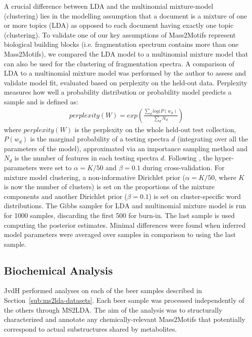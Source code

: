 A crucial difference between LDA and the multinomial mixture-model (clustering) lies in the modelling assumption that a document is a mixture of one or more topics (LDA) as opposed to each document having exactly one topic (clustering). To validate one of our key assumptions of Mass2Motifs represent biological building blocks (i.e. fragmentation spectrum contains more than one Mass2Motifs), we compared the LDA model to a multinomial mixture model that can also be used for the clustering of fragmentation spectra. A comparison of LDA to a multinomial mixture model was performed by the author to assess and validate model fit, evaluated based on perplexity on the held-out data. Perplexity measures how well a probability distribution or probability model predicts a sample and is defined as:
\begin{align*}
perplexity(W)=exp\left(\frac{\sum_{d}log(P(w_{d})}{\sum_{d}N_d}\right)
\end{align*}
where $perplexity(W)$ is the perplexity on the whole held-out test collection, $P(w_d)$ is the marginal probability of a testing spectra $d$ (integrating over all the parameters of the model), approximated via an importance sampling method \cite{wallach2009evaluation} and $N_d$ is the number of features in each testing spectra $d$. Following \cite{Griffiths2004}, the hyper-parameters were set to $\alpha=K/50$ and $\beta=0.1$ during cross-validation. For mixture model clustering, a non-informative Dirichlet prior ($\alpha=K/50$, where $K$ is now the number of clusters) is set on the proportions of the mixture components and another Dirichlet prior ($\beta=0.1$) is set on cluster-specific word distributions. The Gibbs sampler for LDA and multinomial mixture model is run for 1000 samples, discarding the first 500 for burn-in. The last sample is used computing the posterior estimates. Minimal differences were found when inferred model parameters were averaged over samples in comparison to using the last sample.

\subsection{Biochemical Analysis}

JvdH performed analyses on each of the beer samples described in Section~\ref{sub:ms2lda-datasets}. Each beer sample was processed independently of the others through MS2LDA. The aim of the analysis was to structurally characterized and annotate any chemically-relevant Mass2Motifs that potentially correspond to actual substructures shared by metabolites. 

